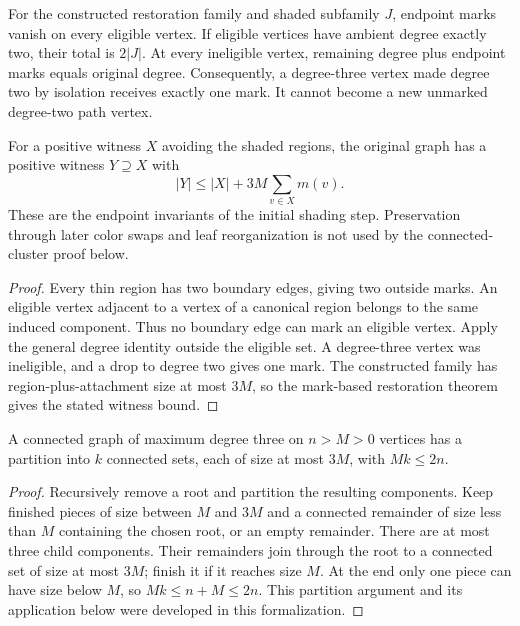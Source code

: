 \begin{theorem}
  \label{thm:lowerbounds-algebraic-constructed-endpoint-marks}
  \leanok
  For the constructed restoration family and shaded subfamily $J$, endpoint
  marks vanish on every eligible vertex. If eligible vertices have ambient
  degree exactly two, their total is $2|J|$. At every ineligible vertex,
  remaining degree plus endpoint marks equals original degree. Consequently,
  a degree-three vertex made degree two by isolation receives exactly one mark.
  It cannot become a new unmarked degree-two path vertex.

  For a positive witness $X$ avoiding the shaded regions, the original graph
  has a positive witness $Y\supseteq X$ with
  \[
    |Y|\le |X|+3M\sum_{v\in X}m(v).
  \]
  These are the endpoint invariants of the initial shading step. Preservation
  through later color swaps and leaf reorganization is not used by the
  connected-cluster proof below.
\end{theorem}
\begin{proof}
  \leanok
  Every thin region has two boundary edges, giving two outside marks.
  An eligible vertex adjacent to a vertex of a canonical region belongs
  to the same induced component. Thus no boundary edge can mark an eligible
  vertex. Apply the general degree identity outside the eligible set.
  A degree-three vertex was ineligible, and a drop to degree two gives one mark.
  The constructed family has region-plus-attachment size at most $3M$,
  so the mark-based restoration theorem gives the stated witness bound.
\end{proof}

\begin{theorem}
  \label{thm:lowerbounds-algebraic-connected-clusters}
  \leanok
  A connected graph of maximum degree three on $n>M>0$ vertices has a
  partition into $k$ connected sets, each of size at most $3M$, with
  $Mk\le 2n$.
\end{theorem}
\begin{proof}
  \leanok
  Recursively remove a root and partition the resulting components.
  Keep finished pieces of size between $M$ and $3M$ and a connected
  remainder of size less than $M$ containing the chosen root, or an empty
  remainder. There are at most three child components. Their remainders
  join through the root to a connected set of size at most $3M$; finish it
  if it reaches size $M$. At the end only one piece can have size below
  $M$, so $Mk\le n+M\le2n$. This partition argument and its application
  below were developed in this formalization.
\end{proof}

